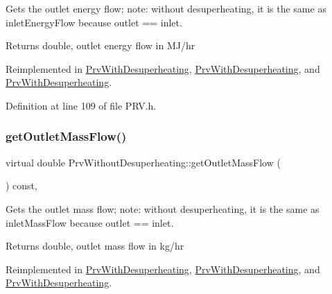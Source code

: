Gets the outlet energy flow; note\+: without desuperheating, it is the same as inlet\+Energy\+Flow because outlet == inlet. \begin{DoxyReturn}{Returns}
double, outlet energy flow in M\+J/hr 
\end{DoxyReturn}


Reimplemented in \hyperlink{class_prv_with_desuperheating_a2394fb62e4fc85252fc4eb15f08e9f1e}{Prv\+With\+Desuperheating}, \hyperlink{class_prv_with_desuperheating_a2394fb62e4fc85252fc4eb15f08e9f1e}{Prv\+With\+Desuperheating}, and \hyperlink{class_prv_with_desuperheating_a2394fb62e4fc85252fc4eb15f08e9f1e}{Prv\+With\+Desuperheating}.



Definition at line 109 of file P\+R\+V.\+h.

\mbox{\label{class_prv_without_desuperheating_aefe4227f2c01209ba4ce79f6b5825d73}} 
\subsubsection{\texorpdfstring{get\+Outlet\+Mass\+Flow()}{getOutletMassFlow()}\hspace{0.1cm}{\footnotesize\ttfamily [1/3]}}
{\footnotesize\ttfamily virtual double Prv\+Without\+Desuperheating\+::get\+Outlet\+Mass\+Flow (\begin{DoxyParamCaption}{ }\end{DoxyParamCaption}) const\hspace{0.3cm}{\ttfamily [inline]}, {\ttfamily [virtual]}}

Gets the outlet mass flow; note\+: without desuperheating, it is the same as inlet\+Mass\+Flow because outlet == inlet. \begin{DoxyReturn}{Returns}
double, outlet mass flow in kg/hr 
\end{DoxyReturn}


Reimplemented in \hyperlink{class_prv_with_desuperheating_a76c03ff2f54c85cd0c80543f23549635}{Prv\+With\+Desuperheating}, \hyperlink{class_prv_with_desuperheating_a76c03ff2f54c85cd0c80543f23549635}{Prv\+With\+Desuperheating}, and \hyperlink{class_prv_with_desuperheating_a76c03ff2f54c85cd0c80543f23549635}{Prv\+With\+Desuperheating}.



